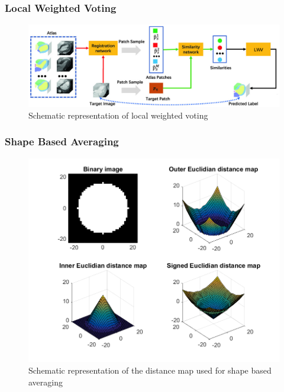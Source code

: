 \subsubsection*{Local Weighted Voting}

\begin{figure}[h!]
	\centering
	\includegraphics[width=0.8\linewidth]{img/localWeightedVoting}
	\caption{Schematic representation of local weighted voting}
	\label{fig:localWeightedVoting}
\end{figure}

\subsubsection*{Shape Based Averaging}

\begin{figure}[h!]
	\centering
	\includegraphics[width=0.8\linewidth]{img/distMap}
	\caption{Schematic representation of the distance map used for shape based averaging}
	\label{fig:distMap}
\end{figure}
